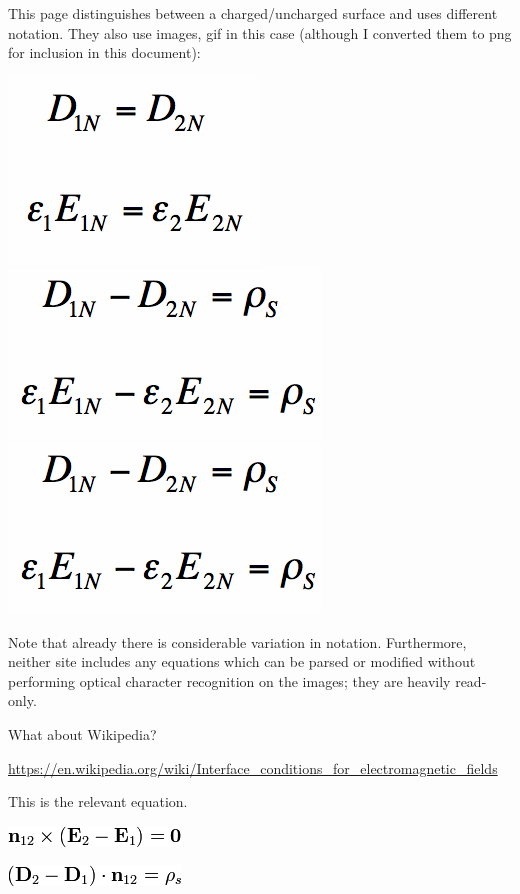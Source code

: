 \documentclass[12pt,letterpaper]{article}
\begin{document}
This page distinguishes between a charged/uncharged surface and uses different notation. They also use images, gif in this case (although I converted them to png for inclusion in this document):
\begin{center}
\includegraphics[scale=0.3]{normalDequal.png}
\includegraphics[scale=0.3]{normalEfieldWithCharge.png}
\includegraphics[scale=0.3]{normalEfieldWithCharge.png}
\end{center}

Note that already there is considerable variation in notation. Furthermore, neither site includes any equations which can be parsed or modified without performing optical character recognition on the images; they are heavily read-only.

What about Wikipedia?

\url{https://en.wikipedia.org/wiki/Interface_conditions_for_electromagnetic_fields}

This is the relevant equation.

\begin{center}
\includegraphics[scale=0.5]{wikipedia1.png}

\includegraphics[scale=0.5]{wikipedia2.png}
\end{center}
\end{document}
